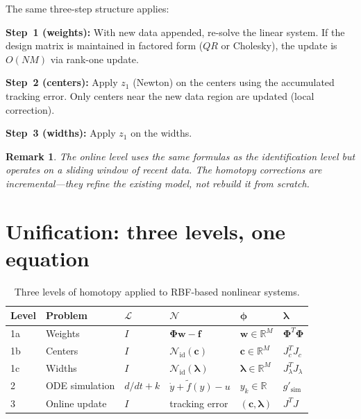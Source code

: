 \documentclass[11pt,a4paper]{article}
\newtheorem{remark}[theorem]{Remark}
\begin{document}
The same three-step structure applies:

\textbf{Step~1 (weights):} With new data appended, re-solve the linear system. If the design matrix is maintained in factored form ($QR$ or Cholesky), the update is $O(NM)$ via rank-one update.

\textbf{Step~2 (centers):} Apply $z_1$ (Newton) on the centers using the accumulated tracking error. Only centers near the new data region are updated (local correction).

\textbf{Step~3 (widths):} Apply $z_1$ on the widths.

\begin{remark}
The online level uses the same formulas as the identification level but operates on a \emph{sliding window} of recent data. The homotopy corrections are incremental---they refine the existing model, not rebuild it from scratch.
\end{remark}


\section{Unification: three levels, one equation}
\label{sec:unification}

\begin{table}[H]
\centering
\caption{Three levels of homotopy applied to RBF-based nonlinear systems.}
\label{tab:levels}
\begin{tabular}{C{0.8cm} L{2.5cm} C{1.3cm} L{3.2cm} L{2.4cm} L{2.0cm}}
\toprule
\textbf{Level} & \textbf{Problem} & $\boldsymbol{\mathcal{L}}$ & $\boldsymbol{\mathcal{N}}$ & $\boldsymbol{\phi}$ & $\boldsymbol{\lambda}$ \\
\midrule
1a & Weights & $I$ & $\boldsymbol{\Phi}\mathbf{w} - \mathbf{f}$ & $\mathbf{w} \in \mathbb{R}^M$ & $\boldsymbol{\Phi}^T\boldsymbol{\Phi}$ \\
1b & Centers & $I$ & $\mathcal{N}_{\mathrm{id}}(\mathbf{c})$ & $\mathbf{c} \in \mathbb{R}^M$ & $J_c^T J_c$ \\
1c & Widths & $I$ & $\mathcal{N}_{\mathrm{id}}(\boldsymbol{\lambda})$ & $\boldsymbol{\lambda} \in \mathbb{R}^M$ & $J_\lambda^T J_\lambda$ \\
2 & ODE simulation & $d/dt + k$ & $\dot{y} + \tilde{f}(y) - u$ & $y_k \in \mathbb{R}$ & $g'_{\mathrm{sim}}$ \\
3 & Online update & $I$ & tracking error & $(\mathbf{c}, \boldsymbol{\lambda})$ & $J^T J$ \\
\bottomrule
\end{tabular}
\end{table}
\end{document}

